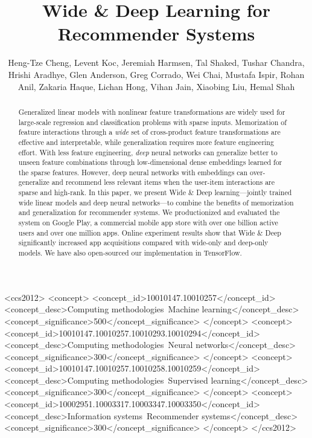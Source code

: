 \documentclass{sig-alternate-05-2015}
\begin{document}
\makeatletter
\def\@copyrightspace{\relax}
\makeatother

\title{Wide \& Deep Learning for Recommender Systems}


\author{
\alignauthor
Heng-Tze Cheng,
Levent Koc,
Jeremiah Harmsen,
Tal Shaked,
Tushar Chandra,
Hrishi Aradhye,
Glen Anderson,
Greg Corrado,
Wei Chai,
Mustafa Ispir,
Rohan Anil,
Zakaria Haque,
Lichan Hong,
Vihan Jain,
Xiaobing Liu,
Hemal Shah\\
}

\maketitle
\begin{abstract}
Generalized linear models with nonlinear feature transformations are widely used for large-scale regression and classification problems with sparse inputs. Memorization of feature interactions through a \textit{wide} set of cross-product feature transformations are effective and interpretable, while generalization requires more feature engineering effort. With less feature engineering, \textit{deep} neural networks can generalize better to unseen feature combinations through low-dimensional dense embeddings learned for the sparse features. However, deep neural networks with embeddings can over-generalize and recommend less relevant items when the user-item interactions are sparse and high-rank. In this paper, we present Wide \& Deep learning---jointly trained wide linear models and deep neural networks---to combine the benefits of memorization and generalization for recommender systems. We productionized and evaluated the system on Google Play, a commercial mobile app store with over one billion active users and over one million apps. Online experiment results show that Wide \& Deep significantly increased app acquisitions compared with wide-only and deep-only models. We have also open-sourced our implementation in TensorFlow.
\end{abstract}


\begin{CCSXML}
<ccs2012>
<concept>
<concept_id>10010147.10010257</concept_id>
<concept_desc>Computing methodologies~Machine learning</concept_desc>
<concept_significance>500</concept_significance>
</concept>
<concept>
<concept_id>10010147.10010257.10010293.10010294</concept_id>
<concept_desc>Computing methodologies~Neural networks</concept_desc>
<concept_significance>300</concept_significance>
</concept>
<concept>
<concept_id>10010147.10010257.10010258.10010259</concept_id>
<concept_desc>Computing methodologies~Supervised learning</concept_desc>
<concept_significance>300</concept_significance>
</concept>
<concept>
<concept_id>10002951.10003317.10003347.10003350</concept_id>
<concept_desc>Information systems~Recommender systems</concept_desc>
<concept_significance>300</concept_significance>
</concept>
</ccs2012>
\end{CCSXML}
\end{document}
